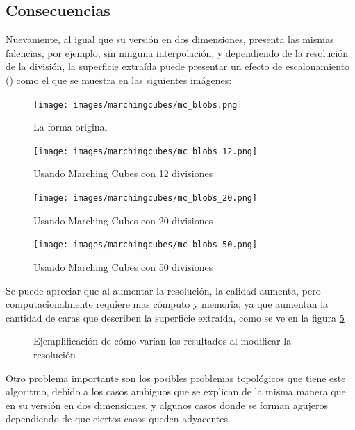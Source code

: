 \subsection{Consecuencias}
\label{subsec:marchingCubes:consecuencias}

Nuevamente, al igual que su versión en dos dimensiones, presenta las mismas falencias, 
por ejemplo, sin ninguna interpolación, y dependiendo de la resolución de la división, la 
superficie extraída puede presentar un efecto de escalonamiento () como el que se 
muestra en las siguientes imágenes:

\begin{figure}[hbp]
\centering
	\texttt{[image: images/marchingcubes/mc\_blobs.png]}
\caption{La forma original}
\label{f:estadoDelArte:mc_blobs}
\end{figure}

\begin{figure}[hbp]
\centering
	\texttt{[image: images/marchingcubes/mc\_blobs\_12.png]}
\caption{Usando Marching Cubes con 12 divisiones}
\label{f:estadoDelArte:mc_blobs_12}
\end{figure}

\begin{figure}[hbp]
\centering
	\texttt{[image: images/marchingcubes/mc\_blobs\_20.png]}
\caption{Usando Marching Cubes con 20 divisiones}
\label{f:estadoDelArte:mc_blobs_20}
\end{figure}

\begin{figure}[hbp]
\centering
	\texttt{[image: images/marchingcubes/mc\_blobs\_50.png]}
\caption{Usando Marching Cubes con 50 divisiones}
\label{f:estadoDelArte:mc_blobs_50}
\end{figure}

Se puede apreciar que al aumentar la resolución, la calidad aumenta, pero 
computacionalmente requiere mas cómputo y memoria, ya que aumentan la cantidad de caras que 
describen la superficie extraída, como se ve en la figura \ref{f:estadoDelArte:polygonise3}

\begin{figure}[hbp]
\centering
\caption{Ejemplificación de cómo varían los resultados al modificar la resolución}
\label{f:estadoDelArte:polygonise3}
\end{figure}

Otro problema importante son los posibles problemas topológicos que tiene este 
algoritmo, debido a los casos ambiguos que se explican de la misma manera que en su versión en 
dos dimensiones, y algunos casos donde se forman agujeros dependiendo de que ciertos casos 
queden adyacentes.

